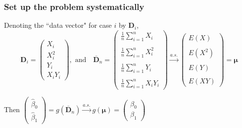 \documentclass[serif]{beamer} %
\begin{document}
\begin{frame}
\frametitle{Set up the problem systematically}
Denoting the ``data vector" for case $i$ by $\mathbf{D}_i$,
{\small
\begin{displaymath}
    \mathbf{D}_i = 
    \left( 
    \begin{array}{c}
    X_i \\ X^2_i \\ Y_i \\ X_i Y_i 
    \end{array}
    \right), \mbox{ and~~ }
     \overline{\mathbf{D}}_n = 
    \left( 
    \begin{array}{l}
    \frac{1}{n}\sum_{i=1}^n X_i \\\\ \frac{1}{n}\sum_{i=1}^n X^2_i \\\\ 
    \frac{1}{n}\sum_{i=1}^n Y_i \\\\ \frac{1}{n}\sum_{i=1}^n  X_i Y_i 
    \end{array}
    \right) \stackrel{a.s.}{\rightarrow}
    \left(
    \begin{array}{l}
    E(X) \\\\ E(X^2) \\\\ 
    E(Y) \\\\ E(XY) 
    \end{array}
    \right) = \boldsymbol{\mu}
\end{displaymath} 
} %

Then $\left( 
    \begin{array}{c}
    \widehat{\beta}_0 \\ \widehat{\beta}_1
    \end{array}
    \right) = g(\overline{\mathbf{D}}_n) \stackrel{a.s.}{\rightarrow} g(\boldsymbol{\mu})
    = \left( 
    \begin{array}{c}
    \beta_0 \\ \beta_1
    \end{array}
    \right)$
\end{frame}
\end{document}
